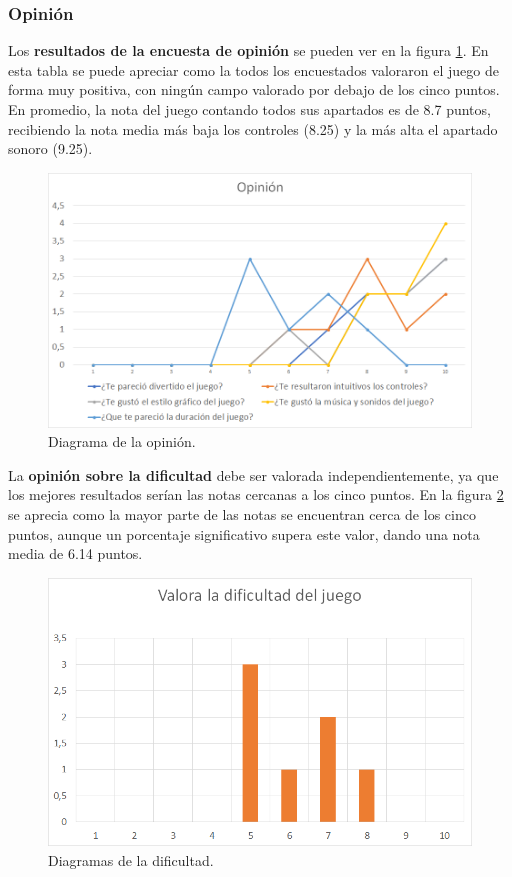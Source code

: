 \subsubsection{Opinión}
Los \textbf{resultados de la encuesta de opinión} se pueden ver en la figura \ref{tabla_opinion}. En esta tabla se puede apreciar como la todos los encuestados valoraron el juego de forma muy positiva, con ningún campo valorado por debajo de los cinco puntos. En promedio, la nota del juego contando todos sus apartados es de 8.7 puntos, recibiendo la nota media más baja los controles (8.25) y la más alta el apartado sonoro (9.25).
\begin{figure}[!t]
   \includegraphics[width=1\linewidth, left]{images/resultados/encuesta/opinion}
   \caption{Diagrama de la opinión.}
   \label{tabla_opinion}
\end{figure}

La \textbf{opinión sobre la dificultad} debe ser valorada independientemente, ya que los mejores resultados serían las notas cercanas a los cinco puntos. En la figura \ref{tabla_dificultad} se aprecia como la mayor parte de las notas se encuentran cerca de los cinco puntos, aunque un porcentaje significativo supera este valor, dando una nota media de 6.14 puntos.
\begin{figure}[!t]
   \includegraphics[width=0.9\linewidth, left]{images/resultados/encuesta/dificultad}
   \caption{Diagramas de la dificultad.}
   \label{tabla_dificultad}
\end{figure}

